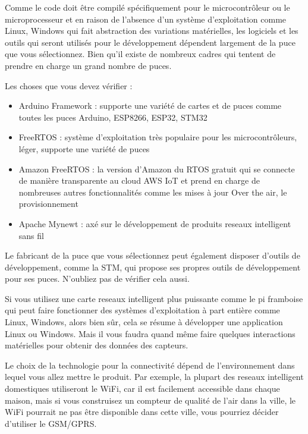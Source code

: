 \documentclass[12pt]{report}
\begin{document}
Comme le code doit être compilé spécifiquement pour le microcontrôleur
ou le microprocesseur et en raison de l'absence d'un système
d'exploitation comme Linux, Windows qui fait abstraction des variations
matérielles, les logiciels et les outils qui seront utilisés pour le
développement dépendent largement de la puce que vous sélectionnez. Bien
qu'il existe de nombreux cadres qui tentent de prendre en charge un
grand nombre de puces.

Les choses que vous devez vérifier :

\begin{itemize}
      \item
            Arduino Framework : supporte une variété de cartes et de puces comme
            toutes les puces Arduino, ESP8266, ESP32, STM32
      \item
            FreeRTOS : système d'exploitation très populaire pour les
            microcontrôleurs, léger, supporte une variété de puces
      \item
            Amazon FreeRTOS : la version d'Amazon du RTOS gratuit qui se connecte
            de manière transparente au cloud AWS IoT et prend en charge de
            nombreuses autres fonctionnalités comme les mises à jour Over the air,
            le provisionnement
      \item
            Apache Mynewt : axé sur le développement de produits reseaux intelligent sans fil
\end{itemize}

Le fabricant de la puce que vous sélectionnez peut également disposer
d'outils de développement, comme la STM, qui propose ses propres outils
de développement pour ses puces. N'oubliez pas de vérifier cela aussi.

Si vous utilisez une carte reseaux intelligent plus puissante comme le pi framboise qui
peut faire fonctionner des systèmes d'exploitation à part entière comme
Linux, Windows, alors bien sûr, cela se résume à développer une
application Linux ou Windows. Mais il vous faudra quand même faire
quelques interactions matérielles pour obtenir des données des capteurs.

Le choix de la technologie pour la connectivité dépend de
l'environnement dans lequel vous allez mettre le produit. Par exemple,
la plupart des reseaux intelligent domestiques utiliseront le WiFi, car il est
facilement accessible dans chaque maison, mais si vous construisez un
compteur de qualité de l'air dans la ville, le WiFi pourrait ne pas être
disponible dans cette ville, vous pourriez décider d'utiliser le
GSM/GPRS.
\end{document}
